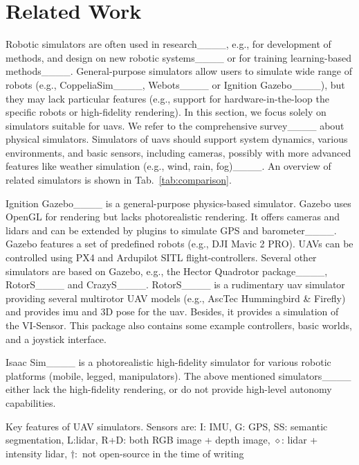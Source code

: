 \section{Related Work}
Robotic simulators are often used in research____, e.g., for development of methods, and design on new robotic systems____ or for training learning-based methods____.
  General-purpose simulators allow users to simulate wide range of robots (e.g., CoppeliaSim____, Webots____ or Ignition Gazebo____), but they may lack particular features (e.g., support for hardware-in-the-loop the specific robots or high-fidelity rendering).
  In this section, we focus solely on simulators suitable for \acp{uav}.
  We refer to the comprehensive survey____ about physical simulators.
  Simulators of \acp{uav} should support system dynamics, various environments, and basic sensors, including cameras, possibly with more advanced features like weather simulation (e.g., wind, rain, fog)____.
  An overview of related simulators is shown in Tab.~\ref{tab:comparison}.

  Ignition Gazebo____ is a general-purpose physics-based simulator.
  Gazebo uses OpenGL for rendering but lacks photorealistic rendering.
  It offers cameras and \acp{lidar} and can be extended by plugins to simulate GPS and barometer____.
  Gazebo features a set of predefined robots (e.g., DJI Mavic 2 PRO).
  UAVs can be controlled using PX4 and Ardupilot SITL flight-controllers.
  Several other simulators are based on Gazebo,
  e.g., the Hector Quadrotor package____, RotorS____
  and CrazyS____.
  RotorS____ is a rudimentary \ac{uav} simulator  
  providing several multirotor UAV models (e.g., AscTec Hummingbird \& Firefly) and  
  provides \ac{imu} and 3D pose for the \ac{uav}.
  Besides, it provides a simulation of the VI-Sensor. 
  This package also contains some example controllers, basic worlds, and a joystick interface. 

  Isaac Sim____ is a photorealistic high-fidelity simulator for various robotic platforms (mobile, legged, manipulators).
  The above mentioned simulators____ either lack the high-fidelity rendering, or do not provide high-level autonomy capabilities.

\begin{table}
\centering
{\small
\setlength{\tabcolsep}{1pt}
\caption{\label{tab:comparison}
Key features of UAV simulators.
Sensors are: I: IMU, G: GPS, SS: semantic segmentation, L:\ac{lidar},
R+D: both RGB image + depth image, 
$\diamond$: \ac{lidar} + intensity \ac{lidar},
$\dagger:$ not open-source in the time of writing}
\vspace{-8pt}
  
}
\vspace{-2em}
\end{table}



